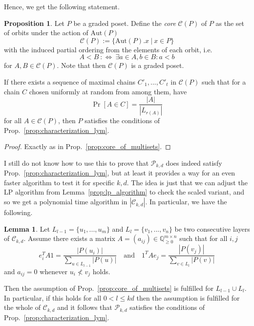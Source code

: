 \documentclass{scrartcl}
\newcommand{\Q}{\mathbb{Q}}
\theoremstyle{definition}
\newtheorem{lemma}[definition]{Lemma}
\newtheorem{proposition}[definition]{Proposition}
\begin{document}
Hence, we get the following statement.
\begin{proposition}
    Let $P$ be a graded poset. Define the \emph{core} $\mathcal{C}(P)$ of $P$ as the set of orbits under the action of $\mathrm{Aut}(P)$ 
    \begin{equation*}
        \mathcal{C}(P) := \{ \mathrm{Aut}(P).x \ | \ x \in P \}
    \end{equation*}
    with the induced partial ordering from the elements of each orbit, i.e.
    \begin{equation*}
        A < B \ :\Leftrightarrow \ \exists a \in A, b \in B: a < b
    \end{equation*}
    for $A, B \in \mathcal{C}(P)$.
    Note that then $\mathcal{C}(P)$ is a graded poset.
    
    If there exists a sequence of maximal chains $C'_1, ..., C'_t$ in $\mathcal{C}(P)$ such that for a chain $C$ chosen uniformly at random from among them, have
    \begin{equation*}
        \Pr[A \in C] = \frac {|A|} {|L_{r(A)}|}
    \end{equation*}
    for all $A \in \mathcal{C}(P)$, then $P$ satisfies the conditions of Prop.~\ref{prop:characterization_lym}.
\end{proposition}
\begin{proof}
    Exactly as in Prop.~\ref{prop:core_of_multisets}.
\end{proof}
I still do not know how to use this to prove that $\mathcal{P}_{k, d}$ does indeed satisfy Prop.~\ref{prop:characterization_lym}, but at least it provides a way for an even faster algorithm to test it for specific $k, d$.
The idea is just that we can adjust the LP algorithm from Lemma~\ref{prop:lp_algorithm} to check the scaled variant, and so we get a polynomial time algorithm in $|\mathcal{C}_{k, d}|$.
In particular, we have the following.
\begin{lemma}
    Let $L_{l - 1} = \{u_1, ..., u_m\}$ and $L_l = \{v_1, ..., v_n\}$ be two consecutive layers of $\mathcal{C}_{k, d}$.
    Assume there exists a matrix $A = (a_{ij}) \in \Q_{\geq 0}^{m \times n}$ such that for all $i, j$
    \begin{equation*}
        e_i^T A 1 = \frac {|P(u_i)|} {\sum_{u \in L_{l - 1}} |P(u)|} \quad \text{and} \quad 1^T A e_j = \frac {|P(v_j)|} {\sum_{v \in L_l} |P(v)|}
    \end{equation*}
    and $a_{ij} = 0$ whenever $u_i \not< v_j$ holds.

    Then the assumption of Prop.~\ref{prop:core_of_multisets} is fulfilled for $L_{l - 1} \cup L_l$.
    In particular, if this holds for all $0 < l \leq kd$ then the assumption is fulfilled for the whole of $\mathcal{C}_{k, d}$ and it follows that $\mathcal{P}_{k, d}$ satisfies the conditions of Prop.~\ref{prop:characterization_lym}.
\end{lemma}
\end{document}
